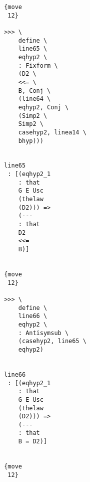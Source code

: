 \documentclass[12pt]{article}
\begin{document}
\begin{verbatim}
                                       {move 
                                        12}

                                       >>> \
                                           define \
                                           line65 \
                                           eqhyp2 \
                                           : Fixform \
                                           (D2 \
                                           <<= \
                                           B, Conj \
                                           (line64 \
                                           eqhyp2, Conj \
                                           (Simp2 \
                                           Simp2 \
                                           casehyp2, linea14 \
                                           bhyp)))


                                       line65 
                                        : [(eqhyp2_1 
                                           : that 
                                           G E Usc 
                                           (thelaw 
                                           (D2))) => 
                                           (--- 
                                           : that 
                                           D2 
                                           <<= 
                                           B)]


                                       {move 
                                        12}

                                       >>> \
                                           define \
                                           line66 \
                                           eqhyp2 \
                                           : Antisymsub \
                                           (casehyp2, line65 \
                                           eqhyp2)


                                       line66 
                                        : [(eqhyp2_1 
                                           : that 
                                           G E Usc 
                                           (thelaw 
                                           (D2))) => 
                                           (--- 
                                           : that 
                                           B = D2)]


                                       {move 
                                        12}


\end{verbatim}
\end{document}
